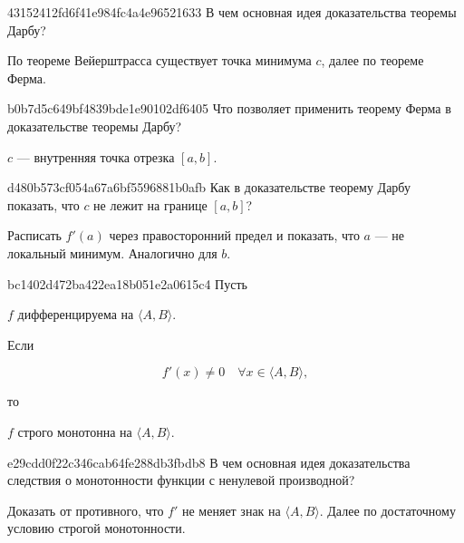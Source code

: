 \begin{note}{43152412fd6f41e984fc4a4e96521633}
    В чем основная идея доказательства теоремы Дарбу?

    \begin{cloze}{1}
        По теореме Вейерштрасса существует точка минимума \( c \), далее по теореме Ферма.
    \end{cloze}
\end{note}

\begin{note}{b0b7d5c649bf4839bde1e90102df6405}
    Что позволяет применить теорему Ферма в доказательстве теоремы Дарбу?

    \begin{cloze}{1}
        \( c \) --- внутренняя точка отрезка \( [a, b] \).
    \end{cloze}
\end{note}

\begin{note}{d480b573cf054a67a6bf5596881b0afb}
    Как в доказательстве теорему Дарбу показать, что \( c \) не лежит на границе \( [a, b] \)?

    \begin{cloze}{1}
        Расписать \( f'(a) \) через правосторонний предел и показать, что \( a \) --- не локальный минимум. Аналогично для \( b \).
    \end{cloze}
\end{note}

\begin{note}{bc1402d472ba422ea18b051e2a0615c4}
    Пусть \begin{icloze}{3}\( f \) дифференцируема на \( \langle A, B \rangle  \).\end{icloze} Если
    \begin{icloze}{2}\[
        f'(x) \neq 0 \quad \forall x \in \langle A, B \rangle,
    \]\end{icloze}
    то \begin{icloze}{1}\( f \) строго монотонна на \( \langle A, B \rangle  \).\end{icloze}
\end{note}

\begin{note}{e29cdd0f22c346cab64fe288db3fbdb8}
    В чем основная идея доказательства следствия о монотонности функции с ненулевой производной?

    \begin{cloze}{1}
        Доказать от противного, что \( f' \) не меняет знак на \( \langle A, B \rangle  \).
        Далее по достаточному условию строгой монотонности.
    \end{cloze}
\end{note}

